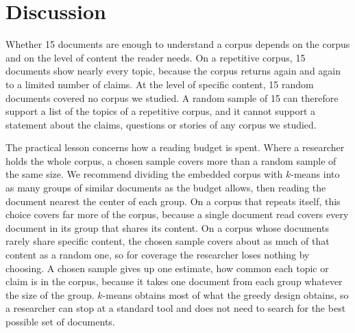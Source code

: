 \section{Discussion}

Whether 15 documents are enough to understand a corpus depends on the corpus and on the level of content the reader needs. On a repetitive corpus, 15 documents show nearly every topic, because the corpus returns again and again to a limited number of claims. At the level of specific content, 15 random documents covered no corpus we studied. A random sample of 15 can therefore support a list of the topics of a repetitive corpus, and it cannot support a statement about the claims, questions or stories of any corpus we studied.

The practical lesson concerns how a reading budget is spent. Where a researcher holds the whole corpus, a chosen sample covers more than a random sample of the same size. We recommend dividing the embedded corpus with $k$-means into as many groups of similar documents as the budget allows, then reading the document nearest the center of each group. On a corpus that repeats itself, this choice covers far more of the corpus, because a single document read covers every document in its group that shares its content. On a corpus whose documents rarely share specific content, the chosen sample covers about as much of that content as a random one, so for coverage the researcher loses nothing by choosing. A chosen sample gives up one estimate, how common each topic or claim is in the corpus, because it takes one document from each group whatever the size of the group. $k$-means obtains most of what the greedy design obtains, so a researcher can stop at a standard tool and does not need to search for the best possible set of documents.


